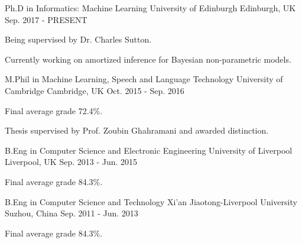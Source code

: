 

\begin{cventries}

  \cventry
    {Ph.D in Informatics: Machine Learning} %
    {University of Edinburgh} %
    {Edinburgh, UK} %
    {Sep. 2017 - PRESENT} %
    {
      \begin{cvitems} %
        \item {Being supervised by Dr. Charles Sutton.}
        \item {Currently working on amortized inference for Bayesian non-parametric models.}
      \end{cvitems}
    }

\cventry
    {M.Phil in Machine Learning, Speech and Language Technology} %
    {University of Cambridge} %
    {Cambridge, UK} %
    {Oct. 2015 - Sep. 2016} %
    {
      \begin{cvitems} %
        \item {Final average grade 72.4\%.}
        \item {Thesis supervised by Prof. Zoubin Ghahramani and awarded distinction.}
      \end{cvitems}
    }

\cventry
    {B.Eng in Computer Science and Electronic Engineering} %
    {University of Liverpool} %
    {Liverpool, UK} %
    {Sep. 2013 - Jun. 2015} %
    {
      \begin{cvitems} %
        \item {Final average grade 84.3\%.}
      \end{cvitems}
    }

\cventry
    {B.Eng in Computer Science and Technology} %
    {Xi'an Jiaotong-Liverpool University} %
    {Suzhou, China} %
    {Sep. 2011 - Jun. 2013} %
    {
      \begin{cvitems} %
        \item {Final average grade 84.3\%.}
      \end{cvitems}
    }

\end{cventries}
